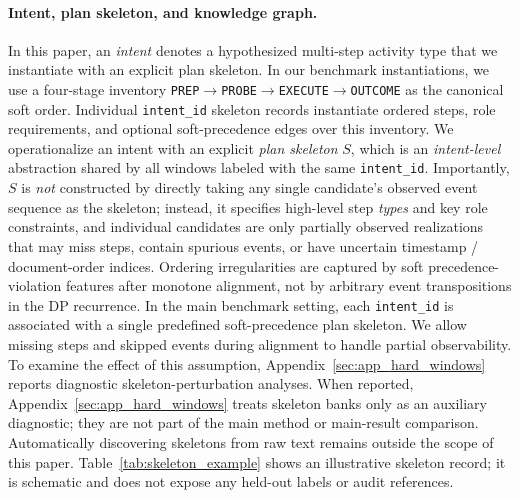 \documentclass{article}
\begin{document}
\paragraph{Intent, plan skeleton, and knowledge graph.}
In this paper, an \emph{intent} denotes a hypothesized multi-step activity type that we instantiate with an explicit plan skeleton.
In our benchmark instantiations, we use a four-stage inventory
\texttt{PREP}$\rightarrow$\texttt{PROBE}$\rightarrow$\texttt{EXECUTE}$\rightarrow$\texttt{OUTCOME}
as the canonical soft order.
Individual \texttt{intent\_id} skeleton records instantiate ordered steps, role requirements, and optional soft-precedence edges over this inventory.
We operationalize an intent with an explicit \emph{plan skeleton} $S$, which is an \emph{intent-level} abstraction shared by all windows labeled with the same \texttt{intent\_id}.
Importantly, $S$ is \emph{not} constructed by directly taking any single candidate's observed event sequence as the skeleton; instead, it specifies high-level step \emph{types} and key role constraints, and individual candidates are only partially observed realizations that may miss steps, contain spurious events, or have uncertain timestamp / document-order indices.
Ordering irregularities are captured by soft precedence-violation features after monotone alignment, not by arbitrary event transpositions in the DP recurrence.
In the main benchmark setting, each \texttt{intent\_id} is associated with a single predefined soft-precedence plan skeleton.
We allow missing steps and skipped events during alignment to handle partial observability.
To examine the effect of this assumption, Appendix~\ref{sec:app_hard_windows} reports diagnostic skeleton-perturbation analyses.
When reported, Appendix~\ref{sec:app_hard_windows} treats skeleton banks only as an auxiliary diagnostic; they are not part of the main method or main-result comparison.
Automatically discovering skeletons from raw text remains outside the scope of this paper.
Table~\ref{tab:skeleton_example} shows an illustrative skeleton record; it is schematic and does not expose any held-out labels or audit references.
\end{document}
